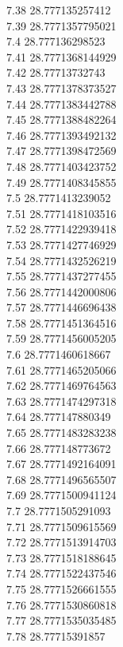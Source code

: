 {7.38	28.777135257412\\
7.39	28.7771357795021\\
7.4	28.777136298523\\
7.41	28.7771368144929\\
7.42	28.77713732743\\
7.43	28.7771378373527\\
7.44	28.7771383442788\\
7.45	28.7771388482264\\
7.46	28.7771393492132\\
7.47	28.7771398472569\\
7.48	28.7771403423752\\
7.49	28.7771408345855\\
7.5	28.7771413239052\\
7.51	28.7771418103516\\
7.52	28.7771422939418\\
7.53	28.7771427746929\\
7.54	28.7771432526219\\
7.55	28.7771437277455\\
7.56	28.7771442000806\\
7.57	28.7771446696438\\
7.58	28.7771451364516\\
7.59	28.7771456005205\\
7.6	28.7771460618667\\
7.61	28.7771465205066\\
7.62	28.7771469764563\\
7.63	28.7771474297318\\
7.64	28.777147880349\\
7.65	28.7771483283238\\
7.66	28.777148773672\\
7.67	28.7771492164091\\
7.68	28.7771496565507\\
7.69	28.7771500941124\\
7.7	28.7771505291093\\
7.71	28.7771509615569\\
7.72	28.7771513914703\\
7.73	28.7771518188645\\
7.74	28.7771522437546\\
7.75	28.7771526661555\\
7.76	28.7771530860818\\
7.77	28.7771535035485\\
7.78	28.77715391857\\
}
